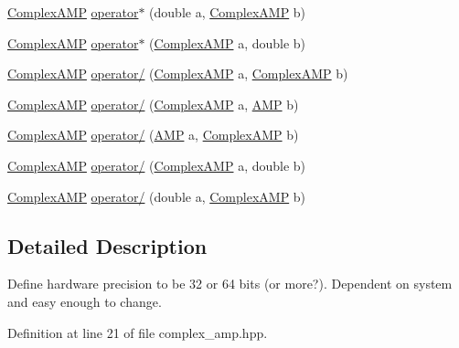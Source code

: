 \begin{DoxyCompactItemize}
\item 
\hyperlink{class_complex_a_m_p}{Complex\+A\+M\+P} \hyperlink{class_complex_a_m_p_ae1f9327003f2a3d598203e52f2e4005c}{operator$\ast$} (double a, \hyperlink{class_complex_a_m_p}{Complex\+A\+M\+P} b)
\item 
\hyperlink{class_complex_a_m_p}{Complex\+A\+M\+P} \hyperlink{class_complex_a_m_p_a9c65836f38335d91a35125b5aeb96ffb}{operator$\ast$} (\hyperlink{class_complex_a_m_p}{Complex\+A\+M\+P} a, double b)
\item 
\hyperlink{class_complex_a_m_p}{Complex\+A\+M\+P} \hyperlink{class_complex_a_m_p_ac970f6f1abdcf9b284e99e0f83c287cd}{operator/} (\hyperlink{class_complex_a_m_p}{Complex\+A\+M\+P} a, \hyperlink{class_complex_a_m_p}{Complex\+A\+M\+P} b)
\item 
\hyperlink{class_complex_a_m_p}{Complex\+A\+M\+P} \hyperlink{class_complex_a_m_p_a549c88c933d9e2dc657ffa55fcd6f11a}{operator/} (\hyperlink{class_complex_a_m_p}{Complex\+A\+M\+P} a, \hyperlink{class_a_m_p}{A\+M\+P} b)
\item 
\hyperlink{class_complex_a_m_p}{Complex\+A\+M\+P} \hyperlink{class_complex_a_m_p_a9025f313f0f61d0cd2dc36892c7a1c9d}{operator/} (\hyperlink{class_a_m_p}{A\+M\+P} a, \hyperlink{class_complex_a_m_p}{Complex\+A\+M\+P} b)
\item 
\hyperlink{class_complex_a_m_p}{Complex\+A\+M\+P} \hyperlink{class_complex_a_m_p_a196673208eaba76be6e3a7d8448f846b}{operator/} (\hyperlink{class_complex_a_m_p}{Complex\+A\+M\+P} a, double b)
\item 
\hyperlink{class_complex_a_m_p}{Complex\+A\+M\+P} \hyperlink{class_complex_a_m_p_a25a4ac460092ef632a3a64f95c335548}{operator/} (double a, \hyperlink{class_complex_a_m_p}{Complex\+A\+M\+P} b)
\end{DoxyCompactItemize}


\subsection{Detailed Description}
Define hardware precision to be 32 or 64 bits (or more?). Dependent on system and easy enough to change. 

Definition at line 21 of file complex\+\_\+amp.\+hpp.



